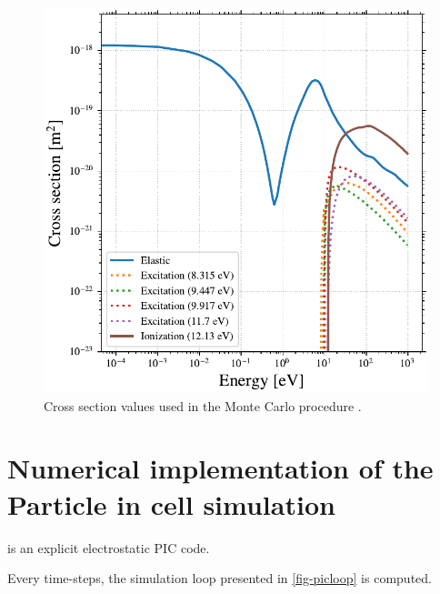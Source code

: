     \begin{figure}[hbtp]
      \centering
      \includegraphics[width=\defaultwidth]{figure/xenon_cross_section.pdf}
      \caption{Cross section values used in the Monte Carlo procedure \cite{Lxcat_Xe,Lxcat_Xe2}.}
      \label{fig-xexsection}
    \end{figure}


\section{Numerical implementation of the Particle in cell simulation}

  \LPPic is an explicit electrostatic \ac{PIC} code.

  Every time-steps, the simulation loop presented in \cref{fig-picloop} is computed.

